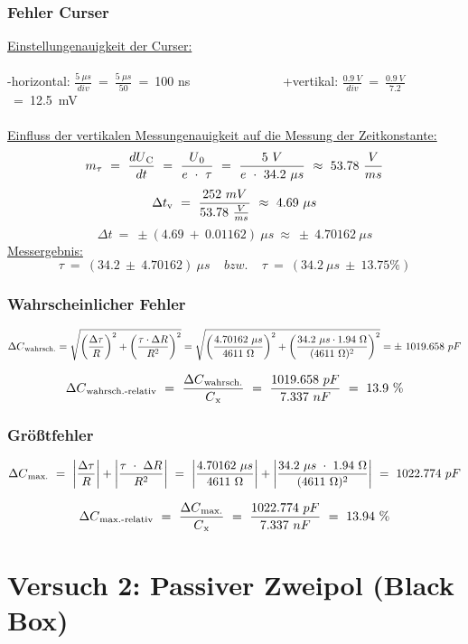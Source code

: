\documentclass[a4paper,12pt]{article}
\begin{document}
\subsubsection* {Fehler Curser}
\underline{Einstellungenauigkeit der Curser:}\\\\
-horizontal: \(\frac{5~\mu s}{div}\)~=~\(\frac{5~\mu s}{50}\)~=~100 ns~~~~~~~~~~~~~~
+vertikal: \(\frac{0.9~V}{div}\)~=~\(\frac{0.9~V}{7.2}\)~=~12.5~mV\\\\
\underline{Einfluss der vertikalen Messungenauigkeit auf die Messung der Zeitkonstante:}\\
\[
m\textsubscript{$\tau$}~=~\frac{dU\textsubscript{C}}{dt}~=~\frac{U\textsubscript{0}}{e~\cdot~\tau}~=~\frac{5~V}{e~\cdot~34.2~\mu s}~\approx~53.78~\frac{V}{ms}
\]
\[
\Delta t\textsubscript{v}~=~\frac{252~mV}{53.78~\frac{V}{ms}}~\approx~4.69~\mu s
\]
\[
\Delta t~=~\pm(4.69~+~ 0.01162)~\mu s~\approx~\pm~4.70162~\mu s
\]
\underline{Messergebnis:}
\[
\tau~=~(34.2~\pm~4.70162)~\mu s~~~~~bzw.~~~~~\tau~=~(34.2~\mu s~\pm~13.75\%)
\]
\subsubsection* {Wahrscheinlicher Fehler}
\[
\Delta C\textsubscript{wahrsch.}=\sqrt{\left(\frac{\Delta \tau}{R}\right)^2+\left(\frac{\tau\cdot\Delta R}{R^2}\right)^2}=\sqrt{\left(\frac{4.70162~\mu s}{4611~\Omega}\right)^2+\left(\frac{34.2~\mu s\cdot1.94~\Omega}{(4611~\Omega)^2}\right)^2}=\pm~1019.658~ pF
\]

\[
\Delta C\textsubscript{wahrsch.-relativ}~=~\frac{\Delta C\textsubscript{wahrsch.}}{C\textsubscript{x}}~=~\frac{1019.658~pF}{7.337~nF}~=~13.9~\%
\]


\subsubsection* {Größtfehler}
\[
\Delta C\textsubscript{max.}~=~\left\lvert \frac{\Delta \tau}{R}\right\rvert+\left\lvert \frac{\tau~\cdot~\Delta R}{R^2}\right\rvert~=~\left\lvert \frac{4.70162~\mu s}{4611~\Omega}\right\rvert+\left\lvert \frac{34.2~\mu s~\cdot~1.94~\Omega}{(4611~\Omega)^2}\right\rvert~=~1022.774~pF
\]

\[
\Delta C\textsubscript{max.-relativ}~=~\frac{\Delta C\textsubscript{max.}}{C\textsubscript{x}}~=~\frac{1022.774~pF}{7.337~nF}~=~13.94~\%
\]



\newpage
\section{Versuch 2: Passiver Zweipol (Black Box)}
\end{document}
